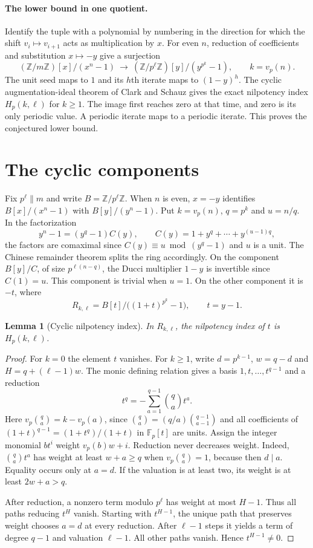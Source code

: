 \documentclass[11pt,letterpaper]{article}
\newtheorem{lemma}[theorem]{Lemma}
\newcommand{\Z}{\mathbb Z}
\newcommand{\F}{\mathbb F}
\begin{document}
\paragraph{The lower bound in one quotient.}
Identify the tuple with a polynomial by numbering in the direction for
which the shift $v_i\mapsto v_{i+1}$ acts as multiplication by $x$.
For even $n$, reduction of coefficients and substitution $x\mapsto-y$ give
a surjection
\[
 (\Z/m\Z)[x]/(x^n-1)\ \longrightarrow\
 (\Z/p^\ell\Z)[y]/(y^{p^k}-1),\qquad k=v_p(n).
\]
The unit seed maps to $1$ and its $h$th iterate maps to $(1-y)^h$.
The cyclic augmentation-ideal theorem of Clark and Schauz
\cite[\S4.3, proof of Theorem 4.7 in the preprint]{cs} gives the exact
nilpotency index $H_p(k,\ell)$ for $k\ge1$. The image first reaches zero at
that time, and zero is its only periodic value. A periodic iterate maps
to a periodic iterate. This proves the conjectured lower bound.

\section{The cyclic components}
Fix $p^\ell\parallel m$ and write $B=\Z/p^\ell\Z$. When $n$ is even,
$x=-y$ identifies $B[x]/(x^n-1)$ with $B[y]/(y^n-1)$. Put
$k=v_p(n)$, $q=p^k$ and $u=n/q$. In the factorization
\[
 y^n-1=(y^q-1)C(y),\qquad C(y)=1+y^q+\cdots+y^{(u-1)q},
\]
the factors are comaximal since $C(y)\equiv u\bmod (y^q-1)$ and $u$ is
a unit. The Chinese remainder theorem splits the ring accordingly.
On the component $B[y]/C$, of size $p^{\ell(n-q)}$, the Ducci multiplier
$1-y$ is invertible since $C(1)=u$. This component is trivial when $u=1$.
On the other component it is $-t$, where
\[
 R_{k,\ell}=B[t]/\bigl((1+t)^{p^k}-1\bigr),\qquad t=y-1.
\]

\begin{lemma}[Cyclic nilpotency index]\label{index}
In $R_{k,\ell}$, the nilpotency index of $t$ is $H_p(k,\ell)$.
\end{lemma}
\begin{proof}
For $k=0$ the element $t$ vanishes. For $k\ge1$, write
$d=p^{k-1}$, $w=q-d$ and $H=q+(\ell-1)w$. The monic defining relation
gives a basis $1,t,\ldots,t^{q-1}$ and a reduction
\[
 t^q=-\sum_{a=1}^{q-1}\binom qa t^a.
\]
Here $v_p\binom qa=k-v_p(a)$, since
$\binom qa=(q/a)\binom{q-1}{a-1}$ and all coefficients of
$(1+t)^{q-1}=(1+t^q)/(1+t)$ in $\F_p[t]$ are units. Assign the
integer monomial $bt^i$ weight $v_p(b)w+i$. Reduction never decreases
weight. Indeed, $\binom qa t^a$ has weight at least $w+a\ge q$ when
$v_p\binom qa=1$, because then $d\mid a$. Equality occurs only at $a=d$.
If the valuation is at least two, its weight is at least $2w+a>q$.

After reduction, a nonzero term modulo $p^\ell$ has weight at most $H-1$.
Thus all paths reducing $t^H$ vanish. Starting with $t^{H-1}$, the unique
path that preserves weight chooses $a=d$ at every reduction. After
$\ell-1$ steps it yields a term of degree $q-1$ and valuation $\ell-1$.
All other paths vanish. Hence $t^{H-1}\ne0$.
\end{proof}
\end{document}
